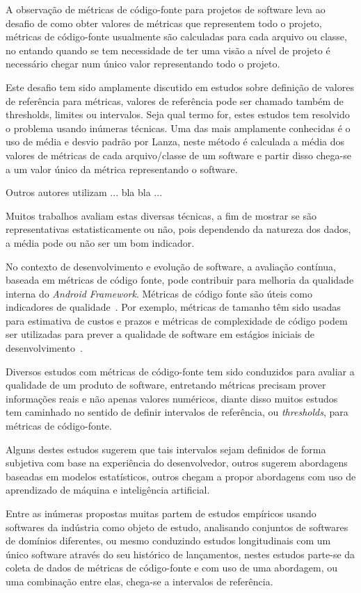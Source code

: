 A observação de métricas de código-fonte para projetos de software leva
ao desafio de como obter valores de métricas que representem todo o projeto,
métricas de código-fonte usualmente são calculadas para cada arquivo ou classe,
no entando quando se tem necessidade de ter uma visão a nível de projeto é
necessário chegar num único valor representando todo o projeto.

Este desafio tem sido amplamente discutido em estudos sobre definição de
valores de referência para métricas, valores de referência pode ser chamado
também de thresholds, limites ou intervalos. Seja qual termo for, estes estudos
tem resolvido o problema usando inúmeras técnicas. Uma das mais amplamente
conhecidas é o uso de média e desvio padrão por Lanza, neste método
é calculada a média dos valores de métricas de cada arquivo/classe de um
software e partir disso chega-se a um valor único da métrica representando
o software.

Outros autores utilizam ... bla bla ...

Muitos trabalhos avaliam estas diversas técnicas, a fim de mostrar se são representativas
estatisticamente ou não, pois dependendo da natureza dos dados, a média pode ou não ser
um bom indicador.

No contexto de desenvolvimento e evolução de software, a avaliação contínua,
baseada em métricas de código fonte, pode contribuir para melhoria da qualidade
interna do {\it Android Framework}.  Métricas de código fonte são úteis como
indicadores de qualidade~\cite{Basili1996}. Por exemplo, métricas de tamanho
têm sido usadas para estimativa de custos e prazos e métricas de complexidade
de código  podem ser utilizadas para prever a qualidade de software em estágios
iniciais de desenvolvimento~\cite{Xing2005}.

Diversos estudos com métricas de código-fonte tem sido conduzidos para avaliar
a qualidade de um produto de software, entretando métricas precisam prover
informações reais e não apenas valores numéricos, diante disso muitos estudos
tem caminhado no sentido de definir intervalos de referência, ou {\it
thresholds}, para métricas de código-fonte.

Alguns destes estudos sugerem que tais intervalos sejam definidos de forma
subjetiva com base na experiência do desenvolvedor, outros sugerem abordagens
baseadas em modelos estatísticos, outros chegam a propor abordagens com uso de
aprendizado de máquina e inteligência artificial.

Entre as inúmeras propostas muitas partem de estudos empíricos usando softwares
da indústria como objeto de estudo, analisando conjuntos de softwares de
domínios diferentes, ou mesmo conduzindo estudos longitudinais com um único
software através do seu histórico de lançamentos, nestes estudos parte-se da
coleta de dados de métricas de código-fonte e com uso de uma abordagem, ou uma
combinação entre elas, chega-se a intervalos de referência.

